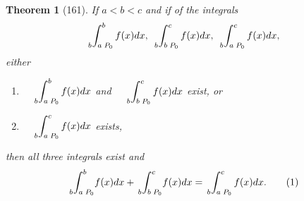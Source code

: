 \documentclass[a4paper,12pt]{book}[2004/02/16]
\providecommand{\colorbox}[2]{#2}
\newcommand{\correction}[2]{\colorbox{corr}{#1}}
\providecommand{\hypertarget}[2]{#2}
\theoremstyle{ilemma}
\theoremstyle{itheorem}
\newtheorem{theorem}{Theorem}
\theoremstyle{iother}
\theoremstyle{icorollary}
\theoremstyle{numcorollary}
\theoremstyle{idefinition}
\begin{document}
\begin{theorem}[161]\hypertarget{thm161}{}
If $a<b<c$ and if of the integrals
\[
  \sideset{_b}{_{a\;P_0}^b} \int f(x)dx, \
  \sideset{_b}{_{b\;P_0}^c} \int f(x)dx, \
  \sideset{_b}{_{a\;P_0}^c} \int f(x)dx,
\]
either
\begin{enumerate}
\item[(a)] $\quad\displaystyle \sideset{_b}{_{a\;P_0}^b}\int
f(x)dx$ \quad and $\quad\displaystyle \sideset{_b}{_{b\;P_0}^c}\int
f(x)dx$ exist, or
\item[(b)] $\quad\displaystyle \sideset{_b}{_{a\;P_0}^c}\int f(x)dx$
exists,
\end{enumerate}
then all three integrals exist and
\hypertarget{eq1p212}{\[
  \text{\correction{$\sideset{_b}{_{a\;P_0}^b}\int$}{$\sideset{}{_{a\;P_0}^b}\int$}} f(x) dx
+ \text{\correction{$\sideset{_b}{_{b\;P_0}^c}\int$}{$\sideset{}{_{b\;P_0}^c}\int$}} f(x) dx
= \sideset{_b}{_{a\; P_0}^c}\int f(x) dx.
\tag{1}
\]}
\end{theorem}
\end{document}
